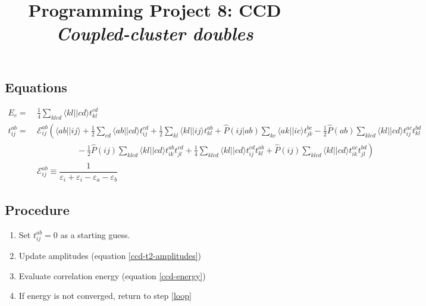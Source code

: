 \documentclass[11pt,fleqn]{article}
\title{Programming Project 8: CCD\\
\textit{Coupled-cluster doubles}}
\author{}
\date{}
\newcommand{\e}{\varepsilon} %
\newcommand{\op}[1]{\ensuremath{\hat{#1}}}
\renewcommand{\sp}{\hspace{30pt}}
\newcommand{\mc}[1]{\ensuremath{\mathcal{#1}}}
\newcommand{\fr}[2]{\ensuremath{\dfrac{#1}{#2}}}
\newcommand{\ip}[1]{\ensuremath{\langle#1\rangle}}
\theoremstyle{mystyle}
\begin{document}
\maketitle
\vspace{-2cm}

\subsection*{Equations}
\begin{align}
\label{ccd-energy}
  E_c
=&\
  \tfrac{1}{4}
  \sum_{klcd}
  \ip{kl||cd}
  t_{kl}^{cd}
\\
\nonumber
  t_{ij}^{ab}
=&\
  \mc{E}_{ij}^{ab}
  \left(
    \ip{ab||ij}
  +
    \tfrac{1}{2}
    \sum_{cd}
    \ip{ab||cd}
    t_{ij}^{cd}
  +
    \tfrac{1}{2}
    \sum_{kl}
    \ip{kl||ij}
    t_{kl}^{ab}
  +
    \op{P}(ij|ab)
    \sum_{kc}
    \ip{ak||ic}
    t_{jk}^{bc}
  -
    \tfrac{1}{2}
    \op{P}(ab)
    \sum_{klcd}
    \ip{kl||cd}
    t_{ij}^{ac}
    t_{kl}^{bd}
  \right.
\\
  &\sp\sp-
  \left.
    \tfrac{1}{2}
    \op{P}(ij)
    \sum_{klcd}
    \ip{kl||cd}
    t_{ik}^{ab}
    t_{jl}^{cd}
  +
    \tfrac{1}{4}
    \sum_{klcd}
    \ip{kl||cd}
    t_{ij}^{cd}
    t_{kl}^{ab}
  +
    \op{P}(ij)
    \sum_{klcd}
    \ip{kl||cd}
    t_{ik}^{ac}
    t_{jl}^{bd}
  \right)
\label{ccd-t2-amplitudes}
\\
\nonumber
&\
  \mc{E}_{ij}^{ab}
\equiv
  \fr{1}{\e_i+\e_i-\e_a-\e_b}
\end{align}


\subsection*{Procedure}

\begin{enumerate}
  \item Set $t_{ij}^{ab}=0$ as a starting guess.
  \item\label{loop} Update amplitudes (equation \ref{ccd-t2-amplitudes})
  \item Evaluate correlation energy (equation \ref{ccd-energy})
  \item If energy is not converged, return to step \ref{loop}
\end{enumerate}
\end{document}
